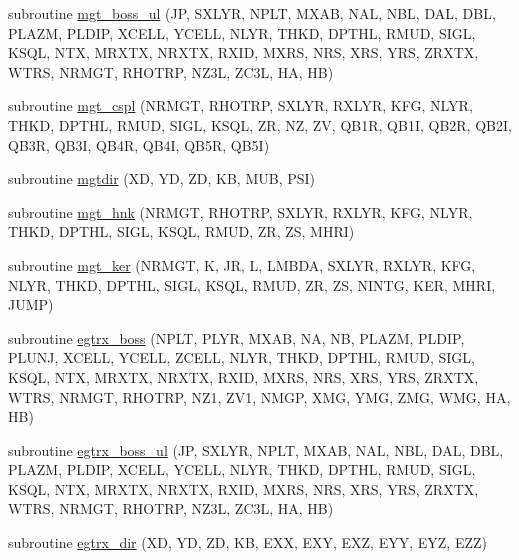 \begin{DoxyCompactItemize}
\item 
subroutine \hyperlink{Leroi__c_8f90_adec9f2398e7872ff5617d3c0adffba35}{mgt\+\_\+boss\+\_\+ul} (JP, S\+X\+L\+YR, N\+P\+LT, M\+X\+AB, N\+AL, N\+BL, D\+AL, D\+BL, P\+L\+A\+ZM, P\+L\+D\+IP, X\+C\+E\+LL, Y\+C\+E\+LL, N\+L\+YR, T\+H\+KD, D\+P\+T\+HL, R\+M\+UD, S\+I\+GL, K\+S\+QL, N\+TX, M\+R\+X\+TX, N\+R\+X\+TX, R\+X\+ID, M\+X\+RS, N\+RS, X\+RS, Y\+RS, Z\+R\+X\+TX, W\+T\+RS, N\+R\+M\+GT, R\+H\+O\+T\+RP, N\+Z3L, Z\+C3L, HA, HB)
\item 
subroutine \hyperlink{Leroi__c_8f90_afd2db4ed971ee6e92ca6da7bece2caff}{mgt\+\_\+cspl} (N\+R\+M\+GT, R\+H\+O\+T\+RP, S\+X\+L\+YR, R\+X\+L\+YR, K\+FG, N\+L\+YR, T\+H\+KD, D\+P\+T\+HL, R\+M\+UD, S\+I\+GL, K\+S\+QL, ZR, NZ, ZV, Q\+B1R, Q\+B1I, Q\+B2R, Q\+B2I, Q\+B3R, Q\+B3I, Q\+B4R, Q\+B4I, Q\+B5R, Q\+B5I)
\item 
subroutine \hyperlink{Leroi__c_8f90_a96acb0ecb10b6c9a318ee0aa7cc60bdc}{mgtdir} (XD, YD, ZD, KB, M\+UB, P\+SI)
\item 
subroutine \hyperlink{Leroi__c_8f90_a8765868cf7e593af1ecbeadd492b6b49}{mgt\+\_\+hnk} (N\+R\+M\+GT, R\+H\+O\+T\+RP, S\+X\+L\+YR, R\+X\+L\+YR, K\+FG, N\+L\+YR, T\+H\+KD, D\+P\+T\+HL, S\+I\+GL, K\+S\+QL, R\+M\+UD, ZR, ZS, M\+H\+RI)
\item 
subroutine \hyperlink{Leroi__c_8f90_ad35190cbd2113592b83c9f1e721b8d07}{mgt\+\_\+ker} (N\+R\+M\+GT, K, JR, L, L\+M\+B\+DA, S\+X\+L\+YR, R\+X\+L\+YR, K\+FG, N\+L\+YR, T\+H\+KD, D\+P\+T\+HL, S\+I\+GL, K\+S\+QL, R\+M\+UD, ZR, ZS, N\+I\+N\+TG, K\+ER, M\+H\+RI, J\+U\+MP)
\item 
subroutine \hyperlink{Leroi__c_8f90_a7312ba6fbf8b492624e2663b1255893f}{egtrx\+\_\+boss} (N\+P\+LT, P\+L\+YR, M\+X\+AB, NA, NB, P\+L\+A\+ZM, P\+L\+D\+IP, P\+L\+U\+NJ, X\+C\+E\+LL, Y\+C\+E\+LL, Z\+C\+E\+LL, N\+L\+YR, T\+H\+KD, D\+P\+T\+HL, R\+M\+UD, S\+I\+GL, K\+S\+QL, N\+TX, M\+R\+X\+TX, N\+R\+X\+TX, R\+X\+ID, M\+X\+RS, N\+RS, X\+RS, Y\+RS, Z\+R\+X\+TX, W\+T\+RS, N\+R\+M\+GT, R\+H\+O\+T\+RP, N\+Z1, Z\+V1, N\+M\+GP, X\+MG, Y\+MG, Z\+MG, W\+MG, HA, HB)
\item 
subroutine \hyperlink{Leroi__c_8f90_a1770320680e91059231180f0654cce66}{egtrx\+\_\+boss\+\_\+ul} (JP, S\+X\+L\+YR, N\+P\+LT, M\+X\+AB, N\+AL, N\+BL, D\+AL, D\+BL, P\+L\+A\+ZM, P\+L\+D\+IP, X\+C\+E\+LL, Y\+C\+E\+LL, N\+L\+YR, T\+H\+KD, D\+P\+T\+HL, R\+M\+UD, S\+I\+GL, K\+S\+QL, N\+TX, M\+R\+X\+TX, N\+R\+X\+TX, R\+X\+ID, M\+X\+RS, N\+RS, X\+RS, Y\+RS, Z\+R\+X\+TX, W\+T\+RS, N\+R\+M\+GT, R\+H\+O\+T\+RP, N\+Z3L, Z\+C3L, HA, HB)
\item 
subroutine \hyperlink{Leroi__c_8f90_a6bbebe0c58cc288fcd56628de8860916}{egtrx\+\_\+dir} (XD, YD, ZD, KB, E\+XX, E\+XY, E\+XZ, E\+YY, E\+YZ, E\+ZZ)

\end{DoxyCompactItemize}
